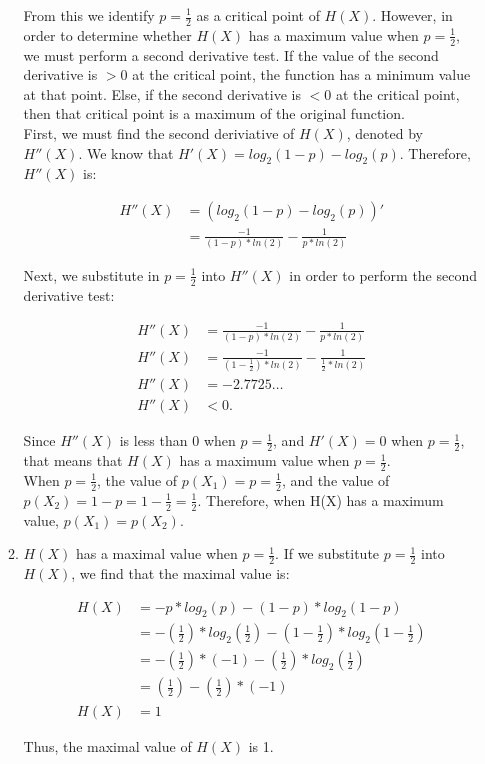 \documentclass[11pt]{article}
\theoremstyle{definition}
\begin{document}
\begin{enumerate}
\begin{enumerate}
From this we identify $p = \frac{1}{2}$ as a critical point of $H(X)$. However, in order to determine whether $H(X)$ has a maximum value when $p = \frac{1}{2}$, we must perform a second derivative
test. If the value of the second derivative is $> 0$ at the critical point, the function has a minimum value at that point. Else, if the second derivative is $< 0$ at the critical point, then that critical
point is a maximum of the original function.\\

First, we must find the second deriviative of $H(X)$, denoted by $H''(X)$. We know that $H'(X) = log_2(1 - p) - log_2(p)$. Therefore, $H''(X)$ is:

\begin{align*}
H''(X) &= (log_2(1 - p) - log_2(p))'\\
&= \frac{-1}{(1 - p) * ln(2)} - \frac{1}{p * ln(2)}
\end{align*}

Next, we substitute in $p = \frac{1}{2}$ into $H''(X)$ in order to perform the second derivative test:

\begin{align*}
H''(X) &= \frac{-1}{(1 - p) * ln(2)} - \frac{1}{p * ln(2)}\\
H''(X) &= \frac{-1}{(1 - \frac{1}{2}) * ln(2)} - \frac{1}{\frac{1}{2} * ln(2)}\\
H''(X) &= -2.7725\ldots \\
H''(X) &< 0.
\end{align*}

Since $H''(X)$ is less than 0 when $p = \frac{1}{2}$, and $H'(X) = 0$ when $p = \frac{1}{2}$, that means that $H(X)$ has a maximum value when $p = \frac{1}{2}$.\\

When $p = \frac{1}{2}$, the value of $p(X_1) = p = \frac{1}{2}$, and the value of $p(X_2) = 1 - p = 1 - \frac{1}{2} = \frac{1}{2}$. Therefore, when H(X) has a maximum value, $p(X_1) = p(X_2)$.

\item $H(X)$ has a maximal value when $p = \frac{1}{2}$. If we substitute $p = \frac{1}{2}$ into $H(X)$, we find that the maximal value is:

\begin{align*}
H(X) &= -p * log_2(p) - (1 - p) * log_2(1 - p)\\
&= -(\frac{1}{2}) * log_2(\frac{1}{2}) - (1 - \frac{1}{2}) * log_2(1 - \frac{1}{2})\\
&= -(\frac{1}{2}) * (-1) - (\frac{1}{2}) * log_2(\frac{1}{2})\\
&= (\frac{1}{2}) - (\frac{1}{2}) * (-1)\\
H(X) &= 1
\end{align*}

Thus, the maximal value of $H(X)$ is 1.

\end{enumerate}

\end{enumerate}
\end{document}
